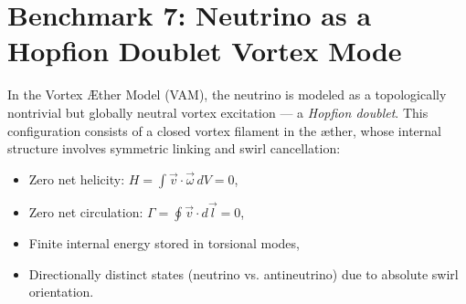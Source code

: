 \section{Benchmark 7: Neutrino as a Hopfion Doublet Vortex Mode}

In the Vortex Æther Model (VAM), the neutrino is modeled as a topologically nontrivial but globally neutral vortex excitation — a \emph{Hopfion doublet}. This configuration consists of a closed vortex filament in the æther, whose internal structure involves symmetric linking and swirl cancellation:

\begin{itemize}
    \item Zero net helicity: \( H = \int \vec{v} \cdot \vec{\omega} \, dV = 0 \),
    \item Zero net circulation: \( \Gamma = \oint \vec{v} \cdot d\vec{l} = 0 \),
    \item Finite internal energy stored in torsional modes,
    \item Directionally distinct states (neutrino vs. antineutrino) due to absolute swirl orientation.
\end{itemize}

